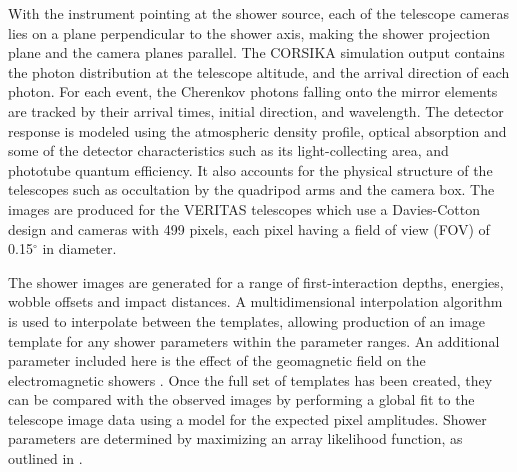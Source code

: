 \documentclass[main.tex]{subfiles}
\begin{document}
With the instrument pointing at the shower source, each of the telescope cameras lies on a plane perpendicular to the shower axis, making the shower projection plane and the camera planes parallel. The CORSIKA simulation output contains the photon distribution at the telescope altitude, and the arrival direction of each photon. For each event, the Cherenkov photons falling onto the mirror elements are tracked by their arrival times, initial direction, and wavelength. The detector response is modeled using the atmospheric density profile, optical absorption and some of the detector characteristics such as its light-collecting area, and phototube quantum efficiency. It also accounts for the physical structure of the telescopes such as occultation by the quadripod arms and the camera box. The images are produced for the VERITAS telescopes which use a Davies-Cotton design and cameras with 499 pixels, each pixel having a field of view (FOV) of 0.15$^\circ$ in diameter.

The shower images are generated for a range of first-interaction depths, energies, wobble offsets and impact distances. A multidimensional interpolation algorithm is used to interpolate between the templates, allowing production of an image template for any shower parameters within the parameter ranges. An additional parameter included here is the effect of the geomagnetic field on the electromagnetic showers \cite{Vincent:2015bnj}.
Once the full set of templates has been created, they can be compared with the observed images by performing a global fit to the telescope image data using a model for the expected pixel amplitudes. Shower parameters are determined by maximizing an array likelihood function, as outlined in \cite{deNaurois}.
\end{document}
